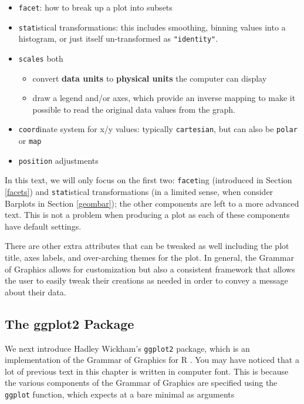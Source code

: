 \documentclass[]{tufte-book}
\providecommand{\tightlist}{%
  \setlength{\itemsep}{0pt}\setlength{\parskip}{0pt}}
\begin{document}
\begin{itemize}
\tightlist
\item
  \texttt{facet}: how to break up a plot into subsets
\item
  \texttt{stat}istical transformations: this includes smoothing, binning
  values into a histogram, or just itself un-transformed as
  \texttt{"identity"}.
\item
  \texttt{scales} both

  \begin{itemize}
  \tightlist
  \item
    convert \textbf{data units} to \textbf{physical units} the computer
    can display
  \item
    draw a legend and/or axes, which provide an inverse mapping to make
    it possible to read the original data values from the graph.
  \end{itemize}
\item
  \texttt{coord}inate system for x/y values: typically
  \texttt{cartesian}, but can also be \texttt{polar} or \texttt{map}
\item
  \texttt{position} adjustments
\end{itemize}

In this text, we will only focus on the first two: \texttt{facet}ing
(introduced in Section \ref{facets}) and \texttt{stat}istical
transformations (in a limited sense, when consider Barplots in Section
\ref{geombar}); the other components are left to a more advanced text.
This is not a problem when producing a plot as each of these components
have default settings.

There are other extra attributes that can be tweaked as well including
the plot title, axes labels, and over-arching themes for the plot. In
general, the Grammar of Graphics allows for customization but also a
consistent framework that allows the user to easily tweak their
creations as needed in order to convey a message about their data.

\subsection{The ggplot2 Package}\label{the-ggplot2-package}

We next introduce Hadley Wickham's \texttt{ggplot2} package, which is an
implementation of the Grammar of Graphics for R \citep{R-ggplot2}. You
may have noticed that a lot of previous text in this chapter is written
in computer font. This is because the various components of the Grammar
of Graphics are specified using the \texttt{ggplot} function, which
expects at a bare minimal as arguments
\end{document}
